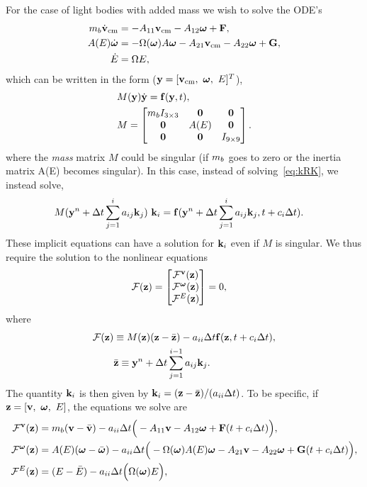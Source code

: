 For the case of light bodies with added mass we wish to solve the ODE's
\begin{align}
   m_{b} \dot{\mathbf{ v}}_{\rm cm} &= -A_{11}\mathbf{ v}_{\rm cm} - A_{12}\boldsymbol{\omega} + \mathbf{ F} ,\\
   A(E) \dot {\boldsymbol{\omega}} & = - \Omega(\boldsymbol{\omega}) A \boldsymbol{\omega} -A_{21}\mathbf{ v}_{\rm cm} - A_{22}\boldsymbol{\omega} + \mathbf{ G} , \\
   \dot E &= \Omega E ,
\end{align}
which can be written in the form ($\mathbf{ y}=[ \mathbf{ v}_{\rm cm}, ~ \boldsymbol{\omega},~ E]^T$), 
\begin{align}
&   M(\mathbf{ y}) \dot {\mathbf{ y}}  = \mathbf{ f}(\mathbf{ y},t) , \\ 
&   M = \begin{bmatrix}
             m_{b} I_{3\times3} & \mathbf{0} & \mathbf{0}\\
             \mathbf{0} & A(E)  & \mathbf{0} \\
             \mathbf{0} & \mathbf{0} & I_{9\times9}
        \end{bmatrix}.
\end{align}
where the {\em mass} matrix $M$ could be singular (if $m_{b}$ goes to zero or the inertia matrix A(E) becomes singular). 
% 
In this case, instead of solving~\eqref{eq:kRK}, we instead solve,
\begin{align}
   M(\mathbf{ y}^n + {\Delta t} \sum_{j=1}^i a_{ij} \mathbf{ k}_j) ~\mathbf{ k}_i &= \mathbf{ f}(\mathbf{ y}^n + {\Delta t} \sum_{j=1}^i a_{ij} \mathbf{ k}_j, t+c_i{\Delta t}).
\end{align}
These implicit equations can have a solution for $\mathbf{ k}_i$ even if $M$ is singular.
We thus require the solution to the nonlinear equations
\begin{align}
 \mathcal{F}(\mathbf{ z}) &= \begin{bmatrix} \mathcal{F}^{\mathbf{ v}}(\mathbf{ z}) \\  \mathcal{F}^{\boldsymbol{\omega}}(\mathbf{ z})\\ \mathcal{F}^{E}(\mathbf{ z}) \end{bmatrix} = 0, \label{eq:NEnonlinear}
\end{align}
where
\begin{align}
 \mathcal{F}(\mathbf{ z}) &\equiv  M(\mathbf{ z}) ( \mathbf{ z} - \bar {\mathbf{ z}})  - a_{ii}{\Delta t} \mathbf{ f}(\mathbf{ z} , t+c_i{\Delta t}), \\
 & \bar {\mathbf{ z}} \equiv \mathbf{ y}^n + {\Delta t} \sum_{j=1}^{i-1} a_{ij} \mathbf{ k}_j .
\end{align}
The quantity $\mathbf{ k}_i$ is then given by $\mathbf{ k}_i = ( \mathbf{ z} - \bar {\mathbf{ z}})/( a_{ii}{\Delta t})$. 
% 
To be specific, if $\mathbf{ z}=[\mathbf{ v},~\boldsymbol{\omega},~E]$, the equations we solve are 
\begin{align}
  \mathcal{F}^{\mathbf{ v}}(\mathbf{ z}) &= m_{b} (\mathbf{ v} -\bar{\mathbf{ v}}) - a_{ii}{\Delta t}\Big( -A_{11}\mathbf{ v} - A_{12}\boldsymbol{\omega} + \mathbf{ F}(t+c_i{\Delta t})\Big) ,\\
  \mathcal{F}^{\boldsymbol{\omega}}(\mathbf{ z}) &= A(E) (\boldsymbol{\omega}-\bar{\boldsymbol{\omega}}) 
               - a_{ii}{\Delta t}\Big( -\Omega(\boldsymbol{\omega}) A(E) \boldsymbol{\omega} - A_{21}\mathbf{ v} - A_{22}\boldsymbol{\omega} + \mathbf{ G}(t+c_i{\Delta t})\Big) , \\
  \mathcal{F}^{E}(\mathbf{ z}) &=  (E-\bar E) - a_{ii}{\Delta t} \Big(  \Omega(\boldsymbol{\omega}) E\Big) ,
\end{align}
